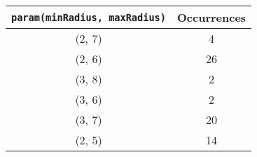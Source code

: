 \documentclass[letterpaper, 12pt]{article}
\begin{document}
\begin{longtable}{|c|c|}
\hline
\textbf{\texttt{param(minRadius, maxRadius)}} & \textbf{Occurrences} \\
\hline
(2, 7) & 4 \\
\hline
(2, 6) & 26 \\
\hline
(3, 8) & 2 \\
\hline
(3, 6) & 2 \\
\hline
(3, 7) & 20 \\
\hline
(2, 5) & 14 \\
\hline
\end{longtable}
\end{document}
